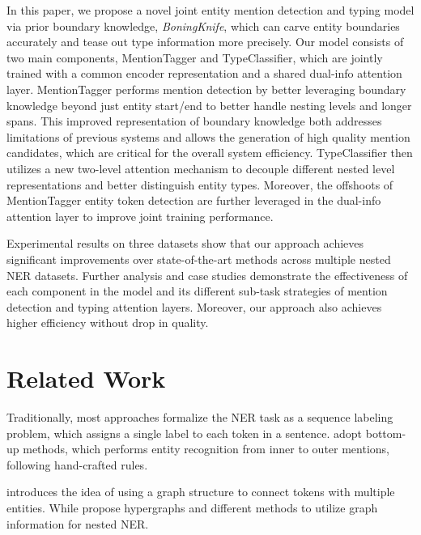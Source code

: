 \documentclass[11pt,a4paper]{article}
\begin{document}
In this paper, we propose a novel joint entity mention detection and typing model via prior boundary knowledge, \textit{BoningKnife}, which can carve entity boundaries accurately and tease out type information more precisely.
Our model consists of two main components, MentionTagger and TypeClassifier, which are jointly trained with a common encoder representation and a shared dual-info attention layer.
MentionTagger performs mention detection by better leveraging boundary knowledge beyond just entity start/end to better handle nesting levels and longer spans. This improved representation of boundary knowledge both addresses limitations of previous systems and allows the generation of high quality mention candidates, which are critical for the overall system efficiency.
TypeClassifier then utilizes a new two-level attention mechanism to decouple different nested level representations and better distinguish entity types.
Moreover, the offshoots of MentionTagger entity token detection are further leveraged in the dual-info attention layer to improve joint training performance.




Experimental results on three datasets show that our approach achieves significant improvements over state-of-the-art methods across multiple nested NER datasets.
Further analysis and case studies demonstrate the effectiveness of each component in the model and its different sub-task strategies of mention detection and typing attention layers. Moreover, our approach also achieves higher efficiency without drop in quality. 



%
 
\section{Related Work}
\label{sec:Related Work}

Traditionally, most approaches formalize the NER task as a sequence labeling problem, which assigns a single label to each token in a sentence.
\cite{shen2003effective,zhang2004enhancing,zhou2006recognizing} adopt bottom-up methods, which performs entity recognition from inner to outer mentions, following hand-crafted rules. 




\citet{lu2015joint} introduces the idea of using a graph structure to connect tokens with multiple entities. While \cite{muis2018labeling,wang2018neural,katiyar2018nested,wang2019combining} propose hypergraphs and different methods to utilize graph information for nested NER. 
\end{document}
